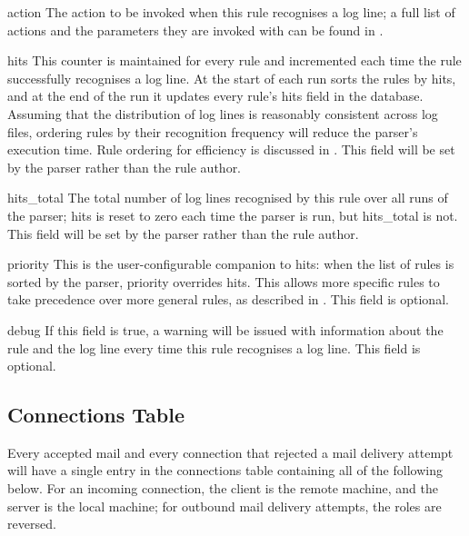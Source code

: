 \begin{boldeqlist}
    \item [action] The action to be invoked when this rule recognises a log
        line; a full list of actions and the parameters they are invoked
        with can be found in .

    \item [hits] This counter is maintained for every rule and incremented
        each time the rule successfully recognises a log line.  At the
        start of each run \parsername{} sorts the rules by hits, and at the end of the run it updates
        every rule's hits field in the database.  Assuming that the
        distribution of log lines is reasonably consistent across log
        files, ordering rules by their recognition frequency will reduce
        the parser's execution time.  Rule ordering for efficiency is
        discussed in .  This field
        will be set by the parser rather than the rule author.

    \item [hits\_total] The total number of log lines recognised by this
        rule over all runs of the parser; hits is reset to zero each time
        the parser is run, but hits\_total is not.  This field will be set
        by the parser rather than the rule author.

    \item [priority] This is the user-configurable companion to hits: when
        the list of rules is sorted by the parser, priority overrides hits.
        This allows more specific rules to take precedence over more
        general rules, as described in .
        This field is optional.

    \item [debug] If this field is true, a warning will be issued with
        information about the rule and the log line every time this rule
        recognises a log line.  This field is optional.

\end{boldeqlist}

\subsection{Connections Table}

\label{connections table}

Every accepted mail and every connection that rejected a mail delivery
attempt will have a single entry in the connections table containing all of
the following below.  For an incoming connection, the client is the remote
machine, and the server is the local machine; for outbound mail delivery
attempts, the roles are reversed.

